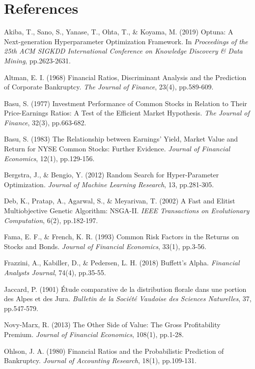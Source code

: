 \documentclass[a4paper,10pt]{article}
\begin{document}
\section{References}
\begin{enumerate}[label={[\,\arabic*\,]},leftmargin=2.6em]
\item Akiba, T., Sano, S., Yanase, T., Ohta, T., \& Koyama, M. (2019) Optuna: A Next-generation Hyperparameter Optimization Framework. In \textit{Proceedings of the 25th ACM SIGKDD International Conference on Knowledge Discovery \& Data Mining}, pp.2623-2631.
\item Altman, E. I. (1968) Financial Ratios, Discriminant Analysis and the Prediction of Corporate Bankruptcy. \textit{The Journal of Finance}, 23(4), pp.589-609.
\item Basu, S. (1977) Investment Performance of Common Stocks in Relation to Their Price-Earnings Ratios: A Test of the Efficient Market Hypothesis. \textit{The Journal of Finance}, 32(3), pp.663-682.
\item Basu, S. (1983) The Relationship between Earnings' Yield, Market Value and Return for NYSE Common Stocks: Further Evidence. \textit{Journal of Financial Economics}, 12(1), pp.129-156.
\item Bergstra, J., \& Bengio, Y. (2012) Random Search for Hyper-Parameter Optimization. \textit{Journal of Machine Learning Research}, 13, pp.281-305.
\item Deb, K., Pratap, A., Agarwal, S., \& Meyarivan, T. (2002) A Fast and Elitist Multiobjective Genetic Algorithm: NSGA-II. \textit{IEEE Transactions on Evolutionary Computation}, 6(2), pp.182-197.
\item Fama, E. F., \& French, K. R. (1993) Common Risk Factors in the Returns on Stocks and Bonds. \textit{Journal of Financial Economics}, 33(1), pp.3-56.
\item Frazzini, A., Kabiller, D., \& Pedersen, L. H. (2018) Buffett's Alpha. \textit{Financial Analysts Journal}, 74(4), pp.35-55.
\item Jaccard, P. (1901) Étude comparative de la distribution florale dans une portion des Alpes et des Jura. \textit{Bulletin de la Société Vaudoise des Sciences Naturelles}, 37, pp.547-579.
\item Novy-Marx, R. (2013) The Other Side of Value: The Gross Profitability Premium. \textit{Journal of Financial Economics}, 108(1), pp.1-28.
\item Ohlson, J. A. (1980) Financial Ratios and the Probabilistic Prediction of Bankruptcy. \textit{Journal of Accounting Research}, 18(1), pp.109-131.

\end{enumerate}
\end{document}
